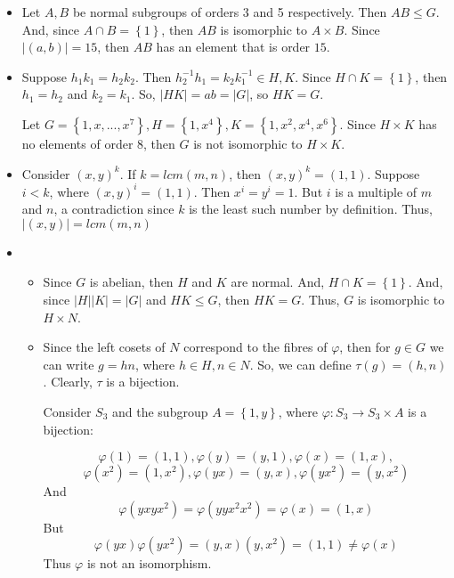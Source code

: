 \documentclass[12pt]{article}
\begin{document}
\begin{itemize}
\begin{itemize}
$$\begin{bmatrix}
1 \\
& & 1 \\
& 1
\end{bmatrix}, \begin{bmatrix}
& 1 \\
& & 1 \\
1
\end{bmatrix} \right\rbrace$$
So $AB \neq BA$.
\end{itemize}
\item[(8)]
Let $A, B$ be normal subgroups of orders 3 and 5 respectively. Then $AB \leq G$. And, since $A \cap B = \left\lbrace 1 \right\rbrace$, then $AB$ is isomorphic to $A \times B$. Since $|(a, b)| = 15$, then $AB$ has an element that is order $15$.
\item[(9)]
Suppose $h_1k_1 = h_2k_2$. Then $h_2^{-1}h_1 = k_2k_1^{-1} \in H, K$. Since $H \cap K = \left\lbrace 1 \right\rbrace$, then $h_1 = h_2$ and $k_2 = k_1$. So, $|HK| = ab = |G|$, so $HK = G$.

Let $G = \left\lbrace 1, x, ..., x^7 \right\rbrace, H = \left\lbrace 1, x^4 \right\rbrace, K = \left\lbrace 1, x^2, x^4, x^6 \right\rbrace$. Since $H \times K$ has no elements of order 8, then $G$ is not isomorphic to $H \times K$.
\item[(10)]
Consider $(x, y)^k$. If $k = lcm(m ,n)$, then $(x, y)^k = (1, 1)$. Suppose $i < k$, where $(x, y)^i = (1, 1)$. Then $x^i = y^i = 1$. But $i$ is a multiple of $m$ and $n$, a contradiction since $k$ is the least such number by definition. Thus, $|(x, y)| = lcm(m, n)$
\item[(11)]
\begin{itemize}
\item[(a)]
Since $G$ is abelian, then $H$ and $K$ are normal. And, $H \cap K = \left\lbrace 1 \right\rbrace$. And, since $|H||K| = |G|$ and $HK \leq G$, then $HK = G$. Thus, $G$ is isomorphic to $H \times N$.
\item[(b)]
Since the left cosets of $N$ correspond to the fibres of $\varphi$, then for $g \in G$ we can write $g = hn$, where $h \in H, n \in N$. So, we can define $\tau(g) = (h, n)$. Clearly, $\tau$ is a bijection.

Consider $S_3$ and the subgroup $A = \left\lbrace 1, y \right\rbrace$, where $\varphi: S_3 \rightarrow S_3 \times A$ is a bijection:

$$\varphi(1) = (1, 1), \varphi(y) = (y, 1), \varphi(x) = (1, x),$$
$$\varphi(x^2) = (1, x^2), \varphi(yx) = (y, x), \varphi(yx^2) = (y, x^2)$$
And
$$\varphi(yxyx^2) = \varphi(yyx^2x^2) = \varphi(x) = (1, x)$$
But
$$\varphi(yx)\varphi(yx^2) = (y, x)(y, x^2) = (1, 1) \neq \varphi(x)$$
Thus $\varphi$ is not an isomorphism.
\end{itemize}
\end{itemize}
\end{document}
